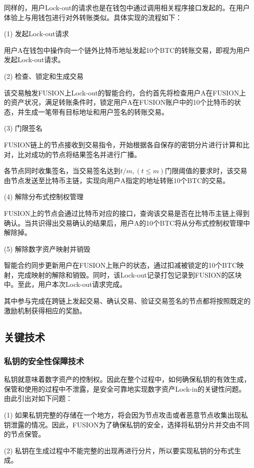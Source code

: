 \documentclass[a4paper,12pt]{article}
\begin{document}
同样的，用户Lock-out的请求也是在钱包中通过调用相关程序接口发起的。在用户体验上与用钱包进行对外转账类似。具体实现的流程如下：

(1) 发起Lock-out请求

用户A在钱包中操作向一个链外比特币地址发起10个BTC的转账交易，即视为用户发起Lock-out请求。

(2) 检查、锁定和生成交易

该交易触发FUSION上Lock-out的智能合约，合约首先将检查用户A在FUSION上的资产状况，满足转账条件时，锁定用户A在FUSION账户中的10个比特币的状态，并生成一笔带有目标地址和用户签名的转账交易。

(3) 门限签名

FUSION链上的节点接收到交易指令，开始根据各自保存的密钥分片进行计算和比对，比对成功的节点将结果签名并进行广播。

各节点同时收集签名，当交易签名达到$t/m,\left( t \le m\right) $门限阈值的要求时，该交易由节点发送至比特币主链，实现向用户A指定的地址转账10个BTC的交易。

(4) 解除分布式控制权管理

FUSION上的节点会通过比特币对应的接口，查询该交易是否在比特币主链上得到确认。当共识得出交易确认的结果后，用户A的10个BTC将从分布式控制权管理中解除掉。

(5) 解除数字资产映射并销毁

智能合约同步更新用户在FUSION上账户的状态，通过扣减被锁定的10个BTC映射，完成映射的解除和销毁。同时，该Lock-out记录打包记录到FUSION的区块中。至此，用户本次Lock-out请求完成。

其中参与完成在跨链上发起交易、确认交易、验证交易签名的节点都将按照既定的激励机制获得相应的奖励。

\subsection{关键技术}

\subsubsection{私钥的安全性保障技术}

私钥就意味着数字资产的控制权。因此在整个过程中，如何确保私钥的有效生成，保管和使用的过程中不泄露，是安全可靠地实现数字资产Lock-in的关键性问题。由此引出对如下问题：

(1) 如果私钥完整的存储在一个地方，将会因为节点攻击或者恶意节点收集出现私钥泄露的情况。因此，FUSION为了确保私钥的安全，选择将私钥分片并交由不同的节点保管。

(2) 私钥在生成过程中不能完整的出现再进行分片，所以要实现私钥的分布式生成。
\end{document}
